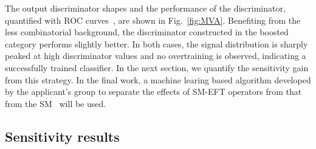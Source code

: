 \documentclass[a4paper,11pt]{article}
\begin{document}
The output discriminator shapes and the performance of the discriminator, quantified with ROC curves~\cite{FAWCETT2006861}, are shown in Fig.~\ref{fig:MVA}. 
Benefiting from the less combinatorial background,
the discriminator constructed in the boosted category performs slightly better. 
In both cases, the signal distribution is sharply peaked at high discriminator values and no overtraining is observed, indicating a successfully trained classifier.
In the next section, we quantify the sensitivity gain from this strategy.
In the final work, a machine learing based algorithm developed by the applicant's group to separate the effects of SM-EFT operators from that from the SM~\cite{Chatterjee:2021nms} will be used.

\subsection{Sensitivity results}
\end{document}
